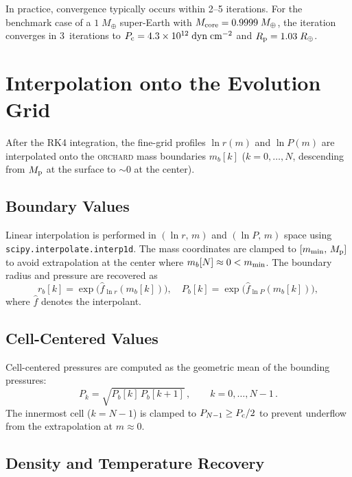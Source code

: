 \documentclass{aastex631}
\newcommand{\Mpl}{M_{\rm p}}
\newcommand{\Rpl}{R_{\rm p}}
\newcommand{\Pc}{P_{\rm c}}
\newcommand{\orchard}{\textsc{orchard}}
\begin{document}
In practice, convergence typically occurs within 2--5 iterations.  For
the benchmark case of a $1\;M_\oplus$ super-Earth with $M_{\rm core} =
0.9999\;M_\oplus$, the iteration converges in 3~iterations to $\Pc =
4.3 \times 10^{12}\;\mathrm{dyn\;cm^{-2}}$ and $\Rpl = 1.03\;R_\oplus$.

\section{Interpolation onto the Evolution Grid}\label{sec:interp}

After the RK4 integration, the fine-grid profiles $\ln r(m)$ and
$\ln P(m)$ are interpolated onto the \orchard{} mass boundaries
$m_b[k]$ ($k = 0,\ldots,N$, descending from $\Mpl$ at the surface to
$\sim 0$ at the center).

\subsection{Boundary Values}

Linear interpolation is performed in $(\ln r,\,m)$ and $(\ln P,\,m)$
space using \texttt{scipy.interpolate.interp1d}.  The mass coordinates
are clamped to $[m_{\rm min},\,\Mpl]$ to avoid extrapolation at the
center where $m_b[N] \approx 0 < m_{\rm min}$.  The boundary radius and
pressure are recovered as
\begin{equation}
  r_b[k] = \exp\!\bigl(\hat{f}_{\ln r}(m_b[k])\bigr), \quad
  P_b[k] = \exp\!\bigl(\hat{f}_{\ln P}(m_b[k])\bigr),
\end{equation}
where $\hat{f}$ denotes the interpolant.

\subsection{Cell-Centered Values}

Cell-centered pressures are computed as the geometric mean of the
bounding pressures:
\begin{equation}\label{eq:Pcell}
  P_k = \sqrt{P_b[k]\,P_b[k+1]}\,,
  \qquad k = 0,\ldots,N-1\,.
\end{equation}
The innermost cell ($k = N-1$) is clamped to $P_{N-1} \geq \Pc / 2$ to
prevent underflow from the extrapolation at $m \approx 0$.

\subsection{Density and Temperature Recovery}
\end{document}
